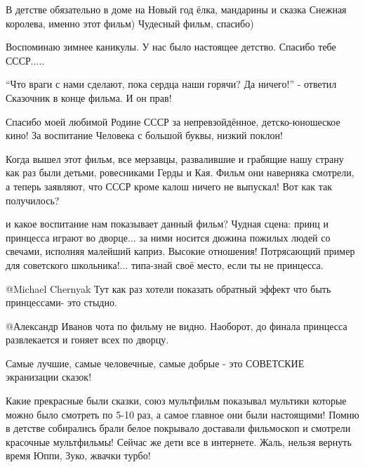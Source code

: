 \begin{itemize}
\begin{multicols}{2}

В детстве обязательно в доме на Новый год ёлка, мандарины и сказка Снежная
королева, именно этот фильм) Чудесный фильм, спасибо)


Воспоминаю зимнее каникулы. У нас было настоящее детство. Спасибо тебе СССР.....


\enquote{Что враги с нами сделают, пока сердца наши горячи? Да ничего!} - ответил
Сказочник в конце фильма. И он прав!


Спасибо  моей любимой Родине СССР за непревзойдённое, детско-юношеское кино! За
воспитание  Человека с большой буквы, низкий поклон!

\begin{itemize} %


Когда вышел этот фильм, все мерзавцы, развалившие и грабящие нашу страну как
раз были детьми, ровесниками Герды и Кая. Фильм они наверняка смотрели, а
теперь заявляют, что СССР кроме калош ничего не выпускал! Вот как так
получилось?


и какое воспитание нам показывает данный фильм? Чудная сцена: принц и принцесса
играют во дворце... за ними носится дюжина пожилых людей со свечами, исполняя
малейший каприз. Высокие отношения! Потрясающий пример для советского
школьника!... типа-знай своё место, если ты не принцесса.


 @Michael Chernyak  Тут как раз хотели показать обратный эффект что быть
 принцессами- это стыдно.

 @Александр Иванов  чота по фильму не видно. Наоборот, до финала принцесса
 развлекается и гоняет всех по дворцу.

\end{itemize} %


Самые лучшие, самые человечные, самые добрые - это СОВЕТСКИЕ экранизации сказок!


Какие прекрасные были сказки, союз мультфильм показывал мультики которые можно
было смотреть по 5-10 раз, а самое главное они были настоящими! Помню в детстве
собирались брали белое покрывало доставали фильмоскоп и смотрели красочные
мультфильмы! Сейчас же дети все в интернете. Жаль, нельзя вернуть время
Юппи, Зуко, жвачки турбо!


\end{multicols}
\end{itemize}
